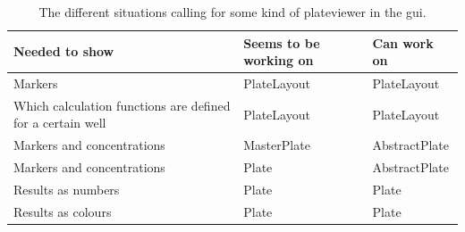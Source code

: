 \documentclass[a4paper,10pt]{article}
\begin{document}
            \begin{table}[hbt]
            
            \begin{center}
            \begin{tabular}{|l|l|l|}
                
                \hline
                \textbf{Needed to show} &
                \textbf{Seems to be working on} &
                \textbf{Can work on} \\
                \hline
                \hline
                Markers &
                PlateLayout &
                PlateLayout \\

                \hline

                Which calculation functions are defined for a certain well &
                PlateLayout &
                PlateLayout \\

                \hline
                
                Markers and concentrations &
                MasterPlate &
                AbstractPlate \\

                Markers and concentrations &
                Plate &
                AbstractPlate \\

                \hline
                
                Results as numbers &
                Plate &
                Plate \\

                Results as colours &
                Plate &
                Plate \\
                
                \hline
            \end{tabular}
            \end{center}
            \caption{The different situations calling for some kind of
                     plateviewer in the gui.}
            \label{plateView}
            \end{table}
    
\end{document}
